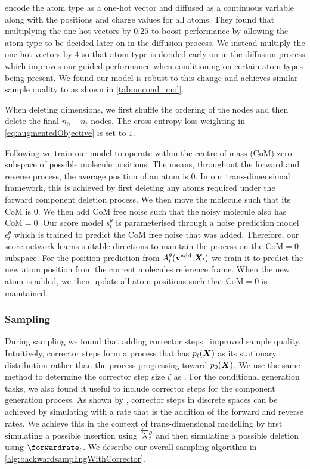 \citet{hoogeboom2022equivariant} encode the atom type as a one-hot vector and diffused as a continuous variable along with the positions and charge values for all atoms. They found that multiplying the one-hot vectors by $0.25$ to boost performance by allowing the atom-type to be decided later on in the diffusion process. We instead multiply the one-hot vectors by $4$ so that atom-type is decided early on in the diffusion process which improves our guided performance when conditioning on certain atom-types being present. We found our model is robust to this change and achieves similar sample quality to \citet{hoogeboom2022equivariant} as shown in \cref{tab:uncond_mol}.

When deleting dimensions, we first shuffle the ordering of the nodes and then delete the final $n_0 - n_t$ nodes. The cross entropy loss weighting in \cref{eq:augmentedObjective} is set to $1$.

Following \citet{hoogeboom2022equivariant} we train our model to operate within the centre of mass (CoM) zero subspace of possible molecule positions. The means, throughout the forward and reverse process, the average position of an atom is $0$. In our trans-dimensional framework, this is achieved by first deleting any atoms required under the forward component deletion process. We then move the molecule such that its CoM is $0$. We then add CoM free noise such that the noisy molecule also has CoM$=0$. Our score model $s_t^\theta$ is parameterised through a noise prediction model $\epsilon_t^\theta$ which is trained to predict the CoM free noise that was added. Therefore, our score network learns suitable directions to maintain the process on the CoM$=0$ subspace. For the position prediction from $A_t^\theta({\mathbf{v}}^{\textup{add}} | {\bm{X}}_t)$ we train it to predict the new atom position from the current molecules reference frame. When the new atom is added, we then update all atom positions such that CoM$=0$ is maintained.

\subsubsection{Sampling}
During sampling we found that adding corrector steps~\citep{song2020score} improved sample quality. Intuitively, corrector steps form a process that has $p_t({\bm{X}})$ as its stationary distribution rather than the process progressing toward $p_0({\bm{X}})$. We use the same method to determine the corrector step size $\zeta$ as \citet{song2020score}. For the conditional generation tasks, we also found it useful to include corrector steps for the component generation process. As shown by \citet{campbell2022continuous}, corrector steps in discrete spaces can be achieved by simulating with a rate that is the addition of the forward and reverse rates. We achieve this in the context of trans-dimensional modelling by first simulating a possible insertion using $\overleftarrow{\lambda}_t^\theta$ and then simulating a possible deletion using $\forwardrate_t$. We describe our overall sampling algorithm in \cref{alg:backwardsamplingWithCorrector}.

